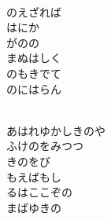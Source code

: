 \documentclass[10pt,b5j]{tarticle} %
\begin{document}
\begin{enumerate}
\begin{minipage}[c]{\blocksize}
        \vspace{\linespace}
        \item~\\
        のえざれば\\
        はにか\\
        がのの\\
        まぬはしく\\
        のもきでて\\
        のにはらん
        
        \vspace{\linespace}
        \item~\\
        あはれゆかしきのや\\
        ふけのをみつつ\\
        きのをび\\
        もえばもし\\
        るはここぞの\\
        まばゆきの
    
    \end{minipage}
\end{enumerate} %
\end{document}
